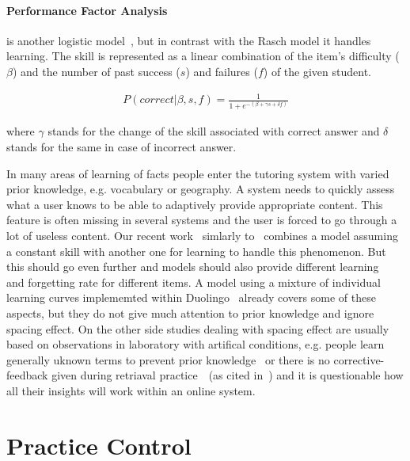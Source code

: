 \documentclass[table,color]{fithesis3/fithesis3}
\begin{document}
\paragraph*{Performance Factor Analysis} is another logistic
model~\cite{pavlik2009performance}, but in contrast with the Rasch model it
handles learning. The skill is represented as a linear combination of the
item's difficulty ($\beta$) and the number of past success ($s$) and failures
($f$) of the given student.

\begin{align}
P(correct|\beta,s, f) = \frac{1}{1 + e^{-(\beta + \gamma s + \delta f)}}
\end{align}

where $\gamma$ stands for the change of the skill associated with correct
answer and $\delta$ stands for the same in case of incorrect answer.

\bigskip

\noindent
In many areas of learning of facts people enter the tutoring system with varied
prior knowledge, e.g. vocabulary or geography. A system needs to quickly assess
what a user knows to be able to adaptively provide appropriate content. This
feature is often missing in several systems and the user is forced to go through
a lot of useless content. Our recent work~\cite{papousek2014adaptive} simlarly
to~\cite{khajah2014integrating} combines a model assuming a constant skill with
another one for learning to handle this phenomenon.  But this should go even
further and models should also provide different
learning~\cite{pelanek2015modeling} and forgetting rate for different items.
A model using a mixture of individual learning curves implememted within
Duolingo~\cite{streeter2015mixture} already covers some of these aspects, but
they do not give much attention to prior knowledge and ignore spacing effect.
On the other side studies dealing with spacing effect are usually based on
observations in laboratory with artifical conditions, e.g.  people learn
generally uknown terms to prevent prior knowledge~\cite{kang2014retrieval} or
there is no corrective-feedback given during retriaval
practice~\cite{landauer1978optimum}~(as cited in~\cite{kang2014retrieval}) and
it is questionable how all their insights will work within an online system.

\section{Practice Control}
\end{document}
